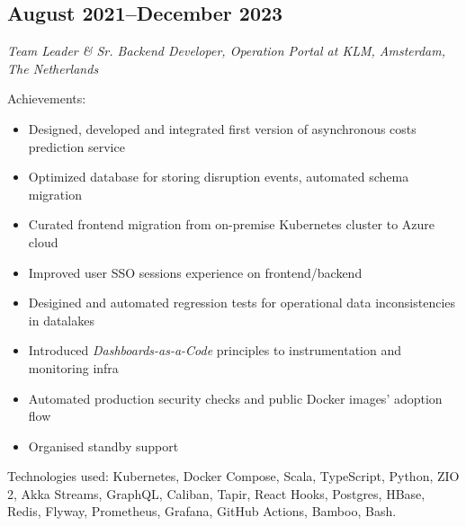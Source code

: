 \subsection*{August 2021--December 2023}

\textit{Team Leader \& Sr. Backend Developer, Operation Portal at KLM, Amsterdam, The Netherlands}

Achievements:
\begin{itemize}[noitemsep]
  \item Designed, developed and integrated first version of asynchronous costs prediction service
  \item Optimized database for storing disruption events, automated schema migration
  \item Curated frontend migration from on-premise Kubernetes cluster to Azure cloud
  \item Improved user SSO sessions experience on frontend/backend
  \item Desigined and automated regression tests for operational data inconsistencies in datalakes
  \item Introduced \textit{Dashboards-as-a-Code} principles to instrumentation and monitoring infra
  \item Automated production security checks and public Docker images' adoption flow
  \item Organised standby support
\end{itemize}

Technologies used: Kubernetes, Docker Compose, Scala, TypeScript, Python, ZIO 2, Akka Streams, GraphQL, Caliban, Tapir,
React Hooks, Postgres, HBase, Redis, Flyway, Prometheus, Grafana, GitHub Actions, Bamboo, Bash.
